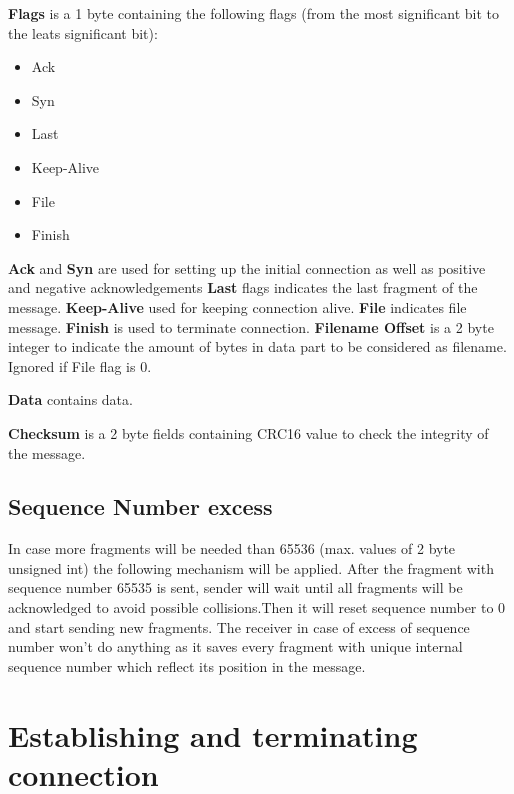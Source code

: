 \documentclass{article}
\begin{document}
\textbf{Flags}  is a 1 byte containing the following flags (from the most significant bit to the leats significant bit):
\begin{itemize}
  \item Ack  
  \item Syn
  \item Last
  \item Keep-Alive
  \item File  
  \item Finish

 
\end{itemize}
\textbf{Ack} and \textbf{Syn} are used for setting up the initial connection as well as positive and negative acknowledgements
\newline
\textbf{Last} flags indicates the last fragment of the message.
\newline
\textbf{Keep-Alive} used for keeping connection alive.
\newline
\textbf{File} indicates file message.
\newline
\textbf{Finish} is used to terminate connection.
\newline
\textbf{Filename Offset}  is a 2 byte integer to indicate the amount of bytes in data part to be considered as filename. Ignored if File flag is 0.
\newline

\textbf{Data} contains data.
\newline

\textbf{Checksum} is a 2 byte fields containing CRC16 value to check the integrity of the message.

\subsection{Sequence Number excess}
In case more fragments will be needed than 65536 (max. values of 2 byte unsigned int) the following mechanism will be applied. After the fragment with sequence number 65535 is sent, sender will wait until all fragments will be acknowledged  to avoid possible collisions.Then it will reset sequence number to 0 and start sending new fragments. The receiver in case of excess of sequence number won't do anything as it saves every fragment with unique internal sequence number which reflect its position in the message.

\newpage
\section{Establishing and terminating connection}
\end{document}
